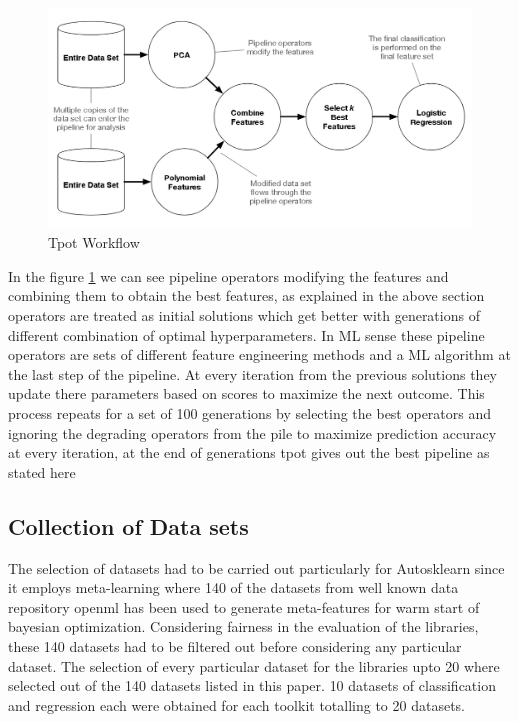          \begin{figure}[!h]
    	\centering
    	\includegraphics[width=1.0\linewidth]{thesis_template/images/tpot-workflow.png}
    	\caption{Tpot  Workflow}
    	\label{fig:tpot_workflow}
        \end{figure}
        
In the figure \ref{fig:tpot_workflow} we can see pipeline operators modifying the features and combining them to obtain the best features, as explained in the above section operators are treated as initial solutions which get better with generations of different combination of optimal hyperparameters. In ML sense these pipeline operators are sets of different feature engineering methods and a ML algorithm at the last step of the pipeline. At every iteration from the previous solutions they update there parameters based on scores to maximize the next outcome. This process repeats for a set of 100 generations by selecting the best operators and ignoring the degrading operators from the pile to maximize prediction accuracy at every iteration, at the end of generations tpot gives out the best pipeline as stated here \cite{tpot}
        
    
\subsection{Collection of Data sets }
The selection of datasets had to be carried out particularly for Autosklearn since it employs meta-learning where 140 of the datasets from well known data repository openml\cite{OpenML2013} has been used to generate meta-features for warm start of bayesian optimization. Considering fairness in the evaluation of the libraries, these 140 datasets had to be filtered out before considering any particular dataset. The selection of every particular dataset for the libraries upto 20 where selected out of the 140 datasets listed in this paper. \cite{autosklearn_supplementary}10 datasets of classification and regression each were obtained for each toolkit totalling to 20 datasets.
   
